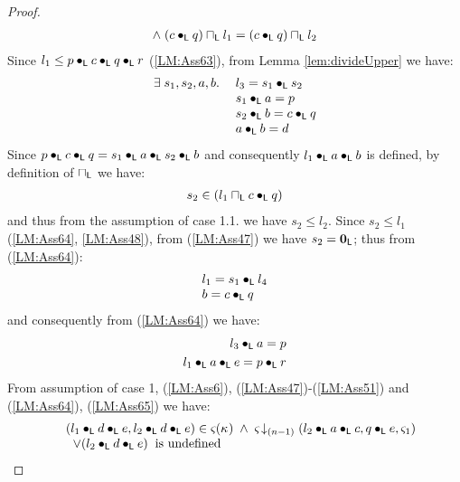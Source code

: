 \begin{lemma}[]
\begin{proof}
\[\begin{array}{l}
		\land\; (c \bullet_{\textsf{L}} q) \sqcap_{\textsf{L}} l_1 = (c \bullet_{\textsf{L}} q) \sqcap_{\textsf{L}} l_2
\end{array}
\]
%
Since $l_1 \leq p \bullet_{\textsf{L}} c \bullet_{\textsf{L}} q \bullet_{\textsf{L}} r$ (\ref{LM:Ass63}), from Lemma \ref{lem:divideUpper} we have:
%
\begin{align}
	\begin{array}{l l}
	\exists\; s_1, s_2, a, b.\;& l_3 = s_1 \bullet_{\textsf{L}} s_2 \\
	& s_1 \bullet_{\textsf{L}} a =  p\\
	& s_2 \bullet_{\textsf{L}} b = c \bullet_{\textsf{L}} q\\
	&a \bullet_{\textsf{L}}  b = d 
	\end{array} \label{LM:Ass64}
\end{align}
%
Since $p \bullet_{\textsf{L}} c \bullet_{\textsf{L}} q  = s_1 \bullet_{\textsf{L}} a \bullet_{\textsf{L}} s_2 \bullet_{\textsf{L}} b $ and consequently $l_1 \bullet_{\textsf{L}} a \bullet_{\textsf{L}} b$ is defined, by definition of $\sqcap_{\textsf{L}}$ we have:
%
\begin{align}
	s_2 \in (l_1 \sqcap_{\textsf{L}} c \bullet_{\textsf{L}} q) \nonumber
\end{align} 
%
and thus from the assumption of case 1.1. we have $s_2 \leq l_2$. Since $s_2 \leq l_1$ (\ref{LM:Ass64}, \ref{LM:Ass48}), from (\ref{LM:Ass47}) we have $s_2 = \mathbf{0}_{\textsf{L}}$; thus from (\ref{LM:Ass64}):
%
\begin{align}
	\begin{array}{l}
	l_1 = s_1 \bullet_{\textsf{L}} l_4\\
	b = c \bullet_{\textsf{L}} q
	\end{array} \label{LM:Ass644}
\end{align} 
% 
and consequently from (\ref{LM:Ass64}) we have:
%
\begin{align}
	l_3 \bullet_{\textsf{L}} a = p \nonumber\\
	l_1 \bullet_{\textsf{L}} a \bullet_{\textsf{L}} e = p \bullet_{\textsf{L}} r \label{LM:Ass65}
\end{align}
%
From assumption of case 1, (\ref{LM:Ass6}), (\ref{LM:Ass47})-(\ref{LM:Ass51}) and (\ref{LM:Ass64}), (\ref{LM:Ass65}) we have:
%
\begin{align}
	\begin{array}{l l}
	& (l_1 \composeL d \composeL e, l_2 \composeL d \composeL e) \in \amod{}(\ca{}) \;\land\; \extendsAMUpto{\amod{}}{(n-1)}{l_2 \composeL a \composeL c}{q \composeL e}{\amod{1}}\\
	& \;\;\lor (l_2 \composeL d \composeL e)\hspace*{0.2cm}\text{is undefined}
	\end{array} \label{LM:Ass66}

\end{align}
\end{proof}
\end{lemma}

